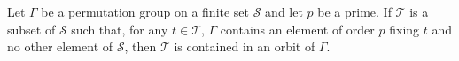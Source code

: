 Let $\Gamma$ be a permutation group on a finite set $\mathcal{S}$ and let $p$ be a prime. If $\mathcal{T}$ is a subset of $\mathcal{S}$ such that, for any $t \in \mathcal{T}$, $\Gamma$ contains an element of order $p$ fixing $t$ and no other element of $\mathcal{S}$, then $\mathcal{T}$ is contained in an orbit of $\Gamma$.
